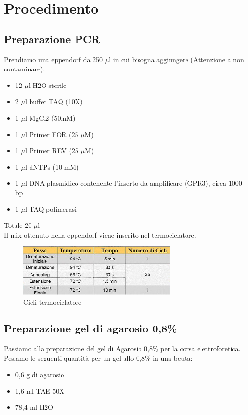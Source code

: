 \section{Procedimento}

\subsection{Preparazione PCR}

Prendiamo una eppendorf da 250 $\mu$l in cui bisogna aggiungere (Attenzione a non contaminare):
\begin{itemize}
	\item 12 $\mu$l H2O sterile
	\item 2 $\mu$l buffer TAQ (10X)
	\item 1 $\mu$l MgCl2 (50mM)
	\item 1 $\mu$l Primer FOR (25 $\mu$M)
	\item 1 $\mu$l Primer REV (25 $\mu$M)
	\item 1 $\mu$l dNTPs (10 mM)
	\item 1 $\mu$l DNA plasmidico contenente l’inserto da amplificare (GPR3), circa 1000 bp
	\item 1 $\mu$l TAQ polimerasi
\end{itemize}

Totale 20 $\mu$l\\

Il mix ottenuto nella eppendorf
viene inserito nel termociclatore.
\begin{figure}[htbp]
	\centering
	\includegraphics[width=80mm]{./immagini/cicli_termociclatore.jpg}
	\caption{Cicli termociclatore}
	\label{cicli_termociclatore}
\end{figure}

\subsection{Preparazione gel di agarosio 0,8\%}

Passiamo alla preparazione del gel di Agarosio 0,8\% per la corsa elettroforetica.
Pesiamo le seguenti quantità per un gel allo 0,8\% in una beuta:

\begin{itemize}
	\item 0,6 g  di agarosio
	\item 1,6  ml TAE 50X
	\item 78,4 ml H2O
\end{itemize}

